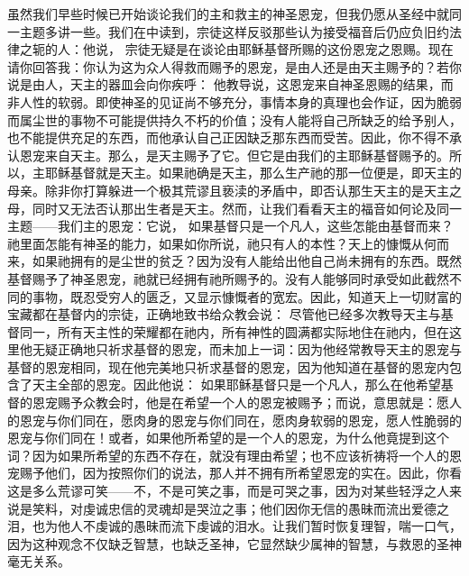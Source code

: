 虽然我们早些时候已开始谈论我们的主和救主的神圣恩宠，但我仍愿从圣经中就同一主题多讲一些。我们在中读到，宗徒这样反驳那些认为接受福音后仍应负旧约法律之轭的人：他说， 宗徒无疑是在谈论由耶稣基督所赐的这份恩宠之恩赐。现在请你回答我：你认为这为众人得救而赐予的恩宠，是由人还是由天主赐予的？若你说是由人，天主的器皿会向你疾呼： 他教导说，这恩宠来自神圣恩赐的结果，而非人性的软弱。即使神圣的见证尚不够充分，事情本身的真理也会作证，因为脆弱而属尘世的事物不可能提供持久不朽的价值；没有人能将自己所缺乏的给予别人，也不能提供充足的东西，而他承认自己正因缺乏那东西而受苦。因此，你不得不承认恩宠来自天主。那么，是天主赐予了它。但它是由我们的主耶稣基督赐予的。所以，主耶稣基督就是天主。如果祂确是天主，那么生产祂的那一位便是，即天主的母亲。除非你打算躲进一个极其荒谬且亵渎的矛盾中，即否认那生天主的是天主之母，同时又无法否认那出生者是天主。然而，让我们看看天主的福音如何论及同一主题——我们主的恩宠：它说， 如果基督只是一个凡人，这些怎能由基督而来？祂里面怎能有神圣的能力，如果如你所说，祂只有人的本性？天上的慷慨从何而来，如果祂拥有的是尘世的贫乏？因为没有人能给出他自己尚未拥有的东西。既然基督赐予了神圣恩宠，祂就已经拥有祂所赐予的。没有人能够同时承受如此截然不同的事物，既忍受穷人的匮乏，又显示慷慨者的宽宏。因此，知道天上一切财富的宝藏都在基督内的宗徒，正确地致书给众教会说： 尽管他已经多次教导天主与基督同一，所有天主性的荣耀都在祂内，所有神性的圆满都实际地住在祂内，但在这里他无疑正确地只祈求基督的恩宠，而未加上一词：因为他经常教导天主的恩宠与基督的恩宠相同，现在他完美地只祈求基督的恩宠，因为他知道在基督的恩宠内包含了天主全部的恩宠。因此他说： 如果耶稣基督只是一个凡人，那么在他希望基督的恩宠赐予众教会时，他是在希望一个人的恩宠被赐予；而说，意思就是：愿人的恩宠与你们同在，愿肉身的恩宠与你们同在，愿肉身软弱的恩宠，愿人性脆弱的恩宠与你们同在！或者，如果他所希望的是一个人的恩宠，为什么他竟提到这个词？因为如果所希望的东西不存在，就没有理由希望；也不应该祈祷将一个人的恩宠赐予他们，因为按照你们的说法，那人并不拥有所希望恩宠的实在。因此，你看这是多么荒谬可笑——不，不是可笑之事，而是可哭之事，因为对某些轻浮之人来说是笑料，对虔诚忠信的灵魂却是哭泣之事；他们因你无信的愚昧而流出爱德之泪，也为他人不虔诚的愚昧而流下虔诚的泪水。让我们暂时恢复理智，喘一口气，因为这种观念不仅缺乏智慧，也缺乏圣神，它显然缺少属神的智慧，与救恩的圣神毫无关系。\par

